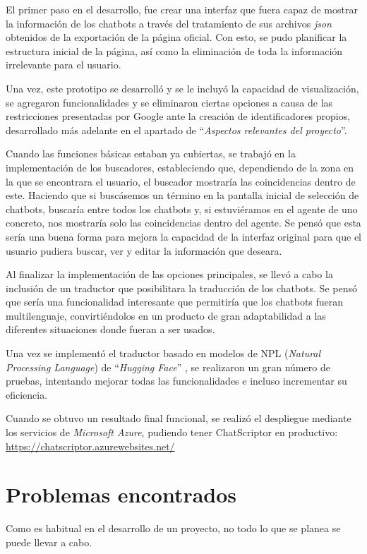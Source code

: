 El primer paso en el desarrollo, fue crear una interfaz que fuera capaz de mostrar la información de los chatbots a través del tratamiento de sus archivos \textit{json} obtenidos de la exportación de la página oficial. Con esto, se pudo planificar la estructura inicial de la página, así como la eliminación de toda la información irrelevante para el usuario.

Una vez, este prototipo se desarrolló y se le incluyó la capacidad de visualización, se agregaron funcionalidades y se eliminaron ciertas opciones a causa de las restricciones presentadas por Google ante la creación de identificadores propios, desarrollado más adelante en el apartado de ``\textit{Aspectos relevantes del proyecto}''.

Cuando las funciones básicas estaban ya cubiertas, se trabajó en la implementación de los buscadores, estableciendo que, dependiendo de la zona en la que se encontrara el usuario, el buscador mostraría las coincidencias dentro de este. Haciendo que si buscásemos un término en la pantalla inicial de selección de chatbots, buscaría entre todos los chatbots y, si estuviéramos en el agente de uno concreto, nos mostraría solo las coincidencias dentro del agente. Se pensó que esta sería una buena forma para mejora la capacidad de la interfaz original para que el usuario pudiera buscar, ver y editar la información que deseara.

Al finalizar la implementación de las opciones principales, se llevó a cabo la inclusión de un traductor que posibilitara la traducción de los chatbots. Se pensó que sería una funcionalidad interesante que permitiría que los chatbots fueran multilenguaje, convirtiéndolos en un producto de gran adaptabilidad a las diferentes situaciones donde fueran a ser usados.

Una vez se implementó el traductor basado en modelos de NPL (\textit{Natural Processing Language}) de ``\textit{Hugging Face}'' \cite{ModelsHu68:online}, se realizaron un gran número de pruebas, intentando mejorar todas las funcionalidades e incluso incrementar su eficiencia.

Cuando se obtuvo un resultado final funcional, se realizó el despliegue mediante los servicios de \textit{Microsoft Azure}, pudiendo tener ChatScriptor en productivo: \url{https://chatscriptor.azurewebsites.net/}

\section{Problemas encontrados}
Como es habitual en el desarrollo de un proyecto, no todo lo que se planea se puede llevar a cabo.

